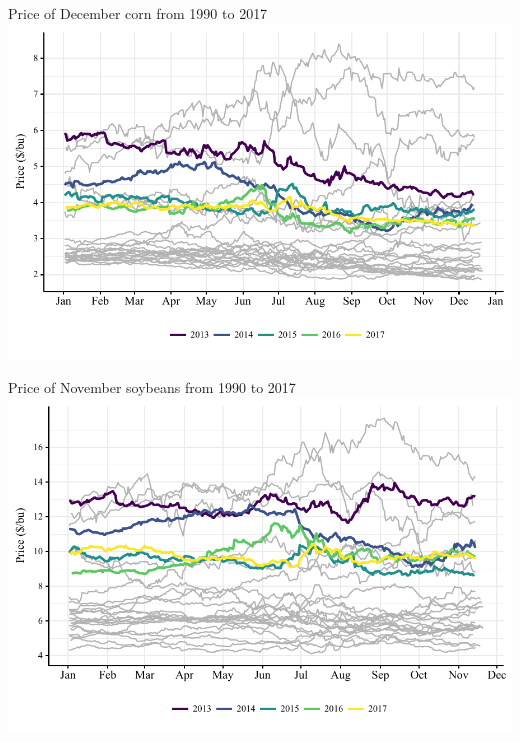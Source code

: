 \documentclass[table,xcolor=pdftex,dvipsnames]{beamer}\usepackage[]{graphicx}\usepackage[]{color}
\makeatletter
\def\maxwidth{ %
  \ifdim\Gin@nat@width>\linewidth
    \linewidth
  \else
    \Gin@nat@width
  \fi
}
\newenvironment{knitrout}{}{} %
\makeatother
\begin{document}



\begin{frame}{Price of December corn from 1990 to 2017}
\begin{knitrout}
\color{fgcolor}
\includegraphics[width=\maxwidth]{figure/figure_corn_futures-1} 

\end{knitrout}
\end{frame}
\begin{frame}{Price of November soybeans from 1990 to 2017}
\begin{knitrout}
\color{fgcolor}
\includegraphics[width=\maxwidth]{figure/figure_soybeans_futures-1} 

\end{knitrout}
\end{frame}
\end{document}
